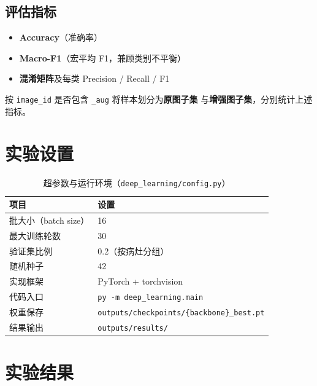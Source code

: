 \documentclass[12pt,a4paper]{ctexart}
\begin{document}
\subsection{评估指标}
\begin{itemize}
  \item \textbf{Accuracy}（准确率）
  \item \textbf{Macro-F1}（宏平均 F1，兼顾类别不平衡）
  \item \textbf{混淆矩阵}及每类 Precision / Recall / F1
\end{itemize}

按 \texttt{image\_id} 是否包含 \texttt{\_aug} 将样本划分为\textbf{原图子集}
与\textbf{增强图子集}，分别统计上述指标。

\section{实验设置}

\begin{table}[H]
  \centering
  \caption{超参数与运行环境（\texttt{deep\_learning/config.py}）}
  \label{tab:hyper}
  \begin{tabular}{ll}
    \toprule
    项目 & 设置 \\
    \midrule
    批大小（batch size） & 16 \\
    最大训练轮数 & 30 \\
    验证集比例 & 0.2（按病灶分组） \\
    随机种子 & 42 \\
    实现框架 & PyTorch + torchvision \\
    代码入口 & \texttt{py -m deep\_learning.main} \\
    权重保存 & \texttt{outputs/checkpoints/\{backbone\}\_best.pt} \\
    结果输出 & \texttt{outputs/results/} \\
    \bottomrule
  \end{tabular}
\end{table}

\section{实验结果}
\end{document}
